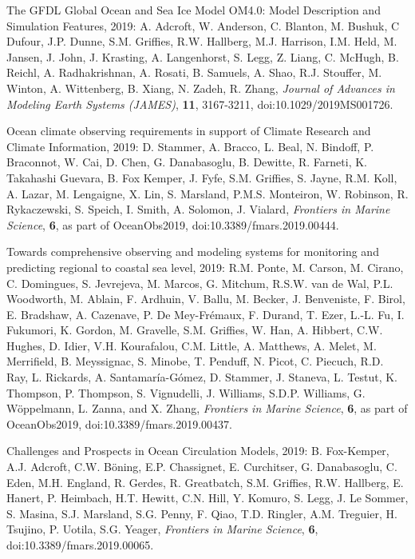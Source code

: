 \begin{etaremune}

\item The GFDL Global Ocean and Sea Ice Model OM4.0: Model Description and Simulation Features, 2019: A. Adcroft, W. Anderson, C. Blanton, M. Bushuk, C Dufour, J.P. Dunne, S.M. Grif\/f\/ies, R.W. Hallberg, M.J. Harrison, I.M. Held, M.  Jansen, J. John, J. Krasting, A. Langenhorst, S. Legg, Z. Liang, C. McHugh, B. Reichl, A. Radhakrishnan, A. Rosati, B. Samuels, A. Shao, R.J. Stouffer, M. Winton, A. Wittenberg, B. Xiang, N. Zadeh, R. Zhang, {\it Journal of Advances in Modeling Earth Systems (JAMES)},
{\bf 11}, 3167-3211, doi:10.1029/2019MS001726.

\item Ocean climate observing requirements in support of Climate Research and Climate Information, 2019: D. Stammer, A. Bracco, L. Beal, N. Bindoff, P. Braconnot, W. Cai, D. Chen, G. Danabasoglu, B. Dewitte, R. Farneti, K. Takahashi Guevara, B. Fox Kemper, J. Fyfe, S.M. Grif\/f\/ies, S. Jayne, R.M. Koll, A. Lazar, M. Lengaigne, X. Lin, S. Marsland, P.M.S. Monteiron, W. Robinson, R. Rykaczewski, S. Speich, I. Smith, A. Solomon, J. Vialard, {\it Frontiers in Marine Science}, {\bf 6}, as part of OceanObs2019, doi:10.3389/fmars.2019.00444.

\item Towards comprehensive observing and modeling systems for monitoring and predicting regional to coastal sea level, 2019: R.M. Ponte, M. Carson, M. Cirano, C. Domingues, S. Jevrejeva, M. Marcos, G. Mitchum, R.S.W. van de Wal, P.L. Woodworth, M. Ablain, F. Ardhuin, V. Ballu, M. Becker, J. Benveniste, F. Birol, E. Bradshaw, A. Cazenave, P. De Mey-{Fr\'{e}maux}, F. Durand, T. Ezer, L.-L. Fu, I. Fukumori, K. Gordon, M. Gravelle, S.M. Grif\/f\/ies, W. Han, A. Hibbert, C.W. Hughes, D. Idier, V.H. Kourafalou, C.M. Little, A. Matthews, A. Melet, M. Merrifield, B. Meyssignac, S. Minobe, T. Penduff, N. Picot, C. Piecuch, R.D. Ray, L. Rickards, A. Santamaría-Gómez, D. Stammer, J. Staneva, L. Testut, K. Thompson, P. Thompson, S. Vignudelli, J. Williams, S.D.P. Williams, G. {W\"{o}ppelmann}, L. Zanna, and X. Zhang, {\it Frontiers in Marine Science}, {\bf 6},  as part of 
OceanObs2019, doi:10.3389/fmars.2019.00437.

\item Challenges and Prospects in Ocean Circulation Models, 2019: B. Fox-Kemper, A.J. Adcroft, C.W. {B\"{o}ning}, E.P. Chassignet, E. Curchitser, G. Danabasoglu, C. Eden, M.H. England, R. Gerdes, R. Greatbatch, S.M. Grif\/f\/ies, R.W. Hallberg, E. Hanert, P. Heimbach, H.T. Hewitt, C.N. Hill, Y. Komuro, S. Legg, J. Le Sommer, S. Masina, S.J. Marsland, S.G. Penny, F. Qiao, T.D. Ringler, A.M. Treguier, H. Tsujino, P. Uotila, S.G. Yeager,
{\it Frontiers in Marine Science}, {\bf 6},
doi:10.3389/fmars.2019.00065.


\end{etaremune}

